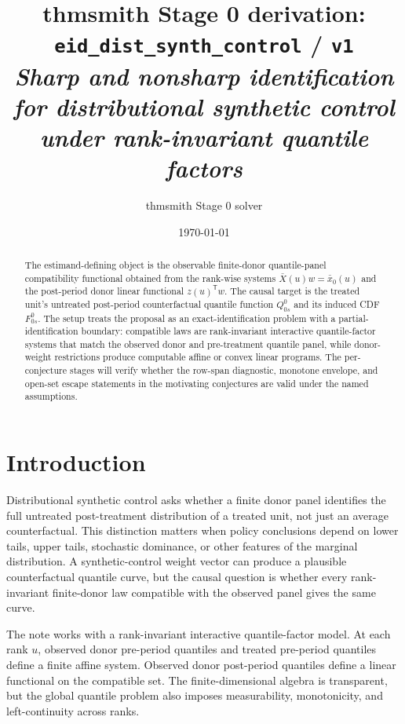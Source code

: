 \documentclass[11pt]{article}
\title{thmsmith Stage 0 derivation: \texttt{eid\_dist\_synth\_control} / \texttt{v1}%
  \\ \large\textit{Sharp and nonsharp identification for distributional synthetic control under rank-invariant quantile factors}}
\author{thmsmith Stage 0 solver}
\date{\today}
\newcommand{\transpose}{\mathsf{T}}
\theoremstyle{definition}
\theoremstyle{plain}
\theoremstyle{remark}
\begin{document}
\maketitle


\begin{abstract}
The estimand-defining object is the observable finite-donor quantile-panel compatibility functional obtained from the rank-wise systems \(\bar X(u)w=\bar x_0(u)\) and the post-period donor linear functional \(z(u)^\transpose w\).  The causal target is the treated unit's untreated post-period counterfactual quantile function \(Q^0_{0s}\) and its induced CDF \(F^0_{0s}\).  The setup treats the proposal as an exact-identification problem with a partial-identification boundary: compatible laws are rank-invariant interactive quantile-factor systems that match the observed donor and pre-treatment quantile panel, while donor-weight restrictions produce computable affine or convex linear programs.  The per-conjecture stages will verify whether the row-span diagnostic, monotone envelope, and open-set escape statements in the motivating conjectures are valid under the named assumptions.
\end{abstract}

\section{Introduction}
Distributional synthetic control asks whether a finite donor panel identifies the full untreated post-treatment distribution of a treated unit, not just an average counterfactual.  This distinction matters when policy conclusions depend on lower tails, upper tails, stochastic dominance, or other features of the marginal distribution.  A synthetic-control weight vector can produce a plausible counterfactual quantile curve, but the causal question is whether every rank-invariant finite-donor law compatible with the observed panel gives the same curve.

The note works with a rank-invariant interactive quantile-factor model.  At each rank \(u\), observed donor pre-period quantiles and treated pre-period quantiles define a finite affine system.  Observed donor post-period quantiles define a linear functional on the compatible set.  The finite-dimensional algebra is transparent, but the global quantile problem also imposes measurability, monotonicity, and left-continuity across ranks.
\end{document}
